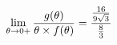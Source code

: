 \documentclass[preview]{standalone}
\begin{document}
\begin{align*}
\lim_{\theta \to 0 +} {g( \theta ) \over {\theta \times f( \theta )}} = \cfrac{\frac{16}{9\sqrt{3}}}{\frac{8}{3}}
\end{align*}
\end{document}
